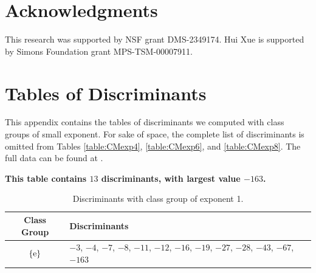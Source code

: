 \documentclass[11pt,letterpaper,reqno]{amsart}
\numberwithin{equation}{section}
\numberwithin{figure}{section}
\numberwithin{table}{section}
\begin{document}
\section*{Acknowledgments}
This research was supported by NSF grant DMS-2349174. Hui Xue is supported by Simons Foundation grant MPS-TSM-00007911.


\appendix
\section{Tables of Discriminants} \label{appendix:tables}

This appendix contains the tables of discriminants we computed with class groups of small exponent.
For sake of space, the complete list of discriminants is omitted from Tables \ref{table:CMexp4}, \ref{table:CMexp6}, and \ref{table:CMexp8}. The full data can be found at \cite[Tables 1-8]{ross-code}.

\begin{table}[H]
\caption{Discriminants with class group of exponent 1.}
\begin{center}
\textbf{This table contains $13$ discriminants, with largest value $-163$. \\ \vspace{2mm}} 
\begin{tabular}{ c | p{125mm} } 
    \label{table:CMexp1}
    Class Group & Discriminants \\ 
    \hline
    $\{\textnormal{e}\}$ & $-3$, $-4$, $-7$, $-8$, $-11$, $-12$, $-16$, $-19$, $-27$, $-28$, $-43$, $-67$, $-163$ \\
    \hline
\end{tabular}
\end{center}
\end{table}
\end{document}

